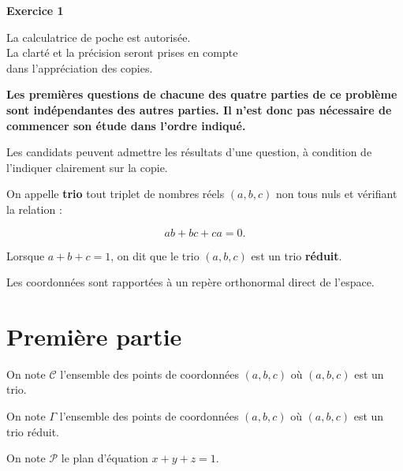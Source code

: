 \DecimalMathComma
\usepackage[np]{numprint}


\begin{center}\textbf{{\color{blue} Exercice 1}}
\end{center}

\begin{center}
La calculatrice de poche est autorisée.\\
La clarté et la précision seront prises en compte\\
dans l'appréciation des copies.
\end{center}

{\bf
Les premières questions de chacune des quatre parties de ce problème sont
indépendantes des autres parties. Il n'est donc pas nécessaire de
commencer son étude dans l'ordre indiqué.

Les candidats peuvent admettre les résultats d'une question, à condition de
l'indiquer clairement sur la copie.}
\newpage
\vspace{1cm}

On appelle \textbf{trio} tout triplet de nombres réels $(a, b, c)$ non tous
nuls et vérifiant la relation :

\[ab + bc + ca = 0.\]

Lorsque $a + b + c = 1$, on dit que le trio $(a, b, c)$ est un trio \textbf{réduit}.

Les coordonnées sont rapportées à un repère orthonormal direct
\Oijk{} de l'espace.


\section*{\color{blue}Première partie}

On note $\mathcal{C}$ l'ensemble des points de coordonnées $(a, b, c)$ où
$(a, b, c)$ est un trio.

On note $\Gamma$ l'ensemble des points de coordonnées $(a,b,c)$ où
$(a, b, c)$ est un trio réduit.

On note $\mathcal{P}$ le plan d'équation $x+y+z=1$.

